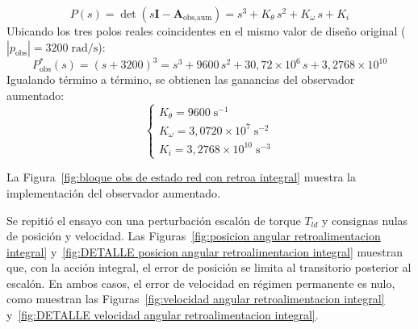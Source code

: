 \documentclass[blue,fullpaper]{ludusofficial}  %
\begin{document}
\begin{equation}
P(s) = \det(s\mathbf{I} - \mathbf{A}_{\text{obs,aum}}) = s^3 + K_{\theta}\,s^2 + K_{\omega}\,s + K_{i}
\end{equation}
Ubicando los tres polos reales coincidentes en el mismo valor de diseño original ($|p_{\text{obs}}| = 3200\;\mathrm{rad/s}$):
\begin{equation}
P_{\text{obs}}^*(s) = (s + 3200)^3 = s^3 + 9600\,s^2 + 30,72\times 10^6\,s + 3,2768\times 10^{10}
\end{equation}
Igualando término a término, se obtienen las ganancias del observador aumentado:
\begin{equation}
\begin{cases}
K_{\theta} = 9600\;\mathrm{s^{-1}} \\
K_{\omega} = 3,0720\times 10^7\;\mathrm{s^{-2}} \\
K_{i} = 3,2768\times 10^{10}\;\mathrm{s^{-3}}
\end{cases}
\end{equation}

La Figura~\ref{fig:bloque obs de estado red con retroa integral} muestra la implementación del observador aumentado.

Se repitió el ensayo con una perturbación escalón de torque $T_{ld}$ y consignas nulas de posición y velocidad. Las Figuras~\ref{fig:posicion angular retroalimentacion integral} y~\ref{fig:DETALLE posicion angular retroalimentacion integral} muestran que, con la acción integral, el error de posición se limita al transitorio posterior al escalón. En ambos casos, el error de velocidad en régimen permanente es nulo, como muestran las Figuras~\ref{fig:velocidad angular retroalimentacion integral} y~\ref{fig:DETALLE velocidad angular retroalimentacion integral}.
\end{document}
